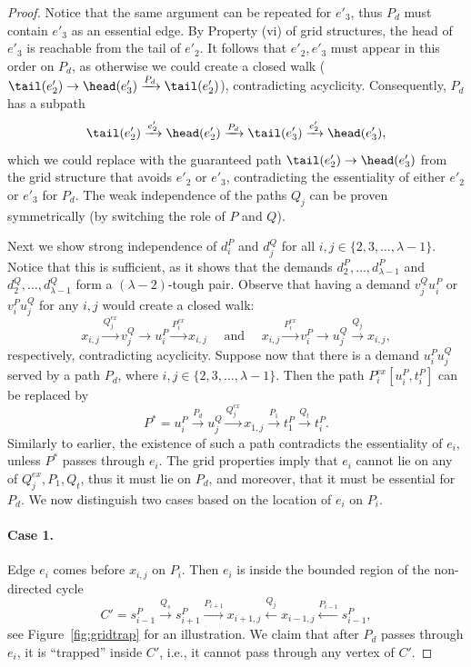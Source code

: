 \begin{proof}
Notice that the same argument can be repeated for $e'_3$, thus $P_d$ must contain $e'_3$ as an essential edge. By Property (vi) of grid structures, the head of $e'_3$ is reachable from the tail of $e'_{2}$. It follows that $e'_2,e'_3$ must appear in this order on $P_d$, as otherwise we could create a closed walk ($\tail(e'_2) \rightarrow \head(e'_3) \xrightarrow{P_d} \tail(e'_2)$), contradicting acyclicity. Consequently, $P_d$ has a subpath \[\tail(e'_2) \xrightarrow{e'_2} \head(e'_2)\xrightarrow{P_d} \tail(e'_3) \xrightarrow{e'_2} \head(e'_3),\] which we could replace with the guaranteed path $\tail(e'_2) \rightarrow \head(e'_3)$ from the grid structure that avoids $e'_2$ or $e'_3$, contradicting the essentiality of either $e'_2$ or $e'_3$ for $P_d$.
The weak independence of the paths $Q_j$ can be proven symmetrically (by switching the role of $P$ and $Q$).

Next we show strong independence of $d^P_i$ and $d^Q_j$ for all $i,j\in \{2,3,\dots,\lambda-1\}$. Notice that this is sufficient, as it shows that the demands $d^P_2,\dots,d^P_{\lambda-1}$ and $d^Q_2,\dots,d^Q_{\lambda-1}$ form a $(\lambda-2)$-tough pair. Observe that having a demand $v^Q_ju^P_i$ or $v^P_iu^Q_j$ for any $i,j$ would create a closed walk:
\[
x_{i,j} \xrightarrow{Q^{ex}_j} v^Q_j \xrightarrow{} u^P_i \xrightarrow{P^{ex}_i} x_{i,j} \quad
\text{ and } \quad
x_{i,j} \xrightarrow{P^{ex}_i} v^P_i \xrightarrow{} u^Q_j \xrightarrow{Q_j} x_{i,j},\]
respectively, contradicting acyclicity.
Suppose now that there is a demand $u^P_iu^Q_j$ served by a path $P_d$, where $i,j\in \{2,3,\dots,\lambda-1\}$. Then the path $P^{ex}_i[u^P_i, t^P_i]$ can be replaced by
\[P^*=u^P_i \xrightarrow{P_d} u^Q_j \xrightarrow{Q^{ex}_j} x_{1,j} \xrightarrow{P_1} t^P_1 \xrightarrow{Q_t} t^P_i.\]
Similarly to earlier, the existence of such a path contradicts the essentiality of $e_i$, unless $P^*$ passes through $e_i$. The grid properties imply that $e_i$ cannot lie on any of $Q^{ex}_j,P_1,Q_t$, thus it must lie on $P_d$, and moreover, that it must be essential for $P_d$. We now distinguish two cases based on the location of $e_i$ on $P_i$.

\paragraph*{Case 1.} Edge $e_i$ comes before $x_{i,j}$ on $P_i$. Then $e_i$ is inside the bounded region of the non-directed cycle
\[C'= s^P_{i-1} \xrightarrow{Q_s} s^P_{i+1} \xrightarrow{P_{i+1}} x_{i+1,j} \xleftarrow{Q_j} x_{i-1,j} \xleftarrow{P_{i-1}} s^P_{i-1},\]
see Figure~\ref{fig:gridtrap} for an illustration.
We claim that after $P_d$ passes through $e_i$, it is ``trapped'' inside $C'$, i.e., it cannot pass through any vertex of $C'$.


\end{proof}
